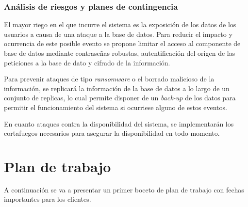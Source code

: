 \documentclass{article}
\begin{document}
\subsubsection*{Análisis de riesgos y planes de contingencia}

El mayor riego en el que incurre el sistema es la exposición de los datos de los usuarios a causa de una ataque a la base de datos. 
Para reducir el impacto y ocurrencia de este posible evento se propone limitar el acceso al componente de base de datos mediante contraseñas robustas, autentificación del origen de las peticiones a la base de dato y cifrado de la información.

Para prevenir ataques de tipo \textit{ransomware} o el borrado malicioso de la información, se replicará la información de la base de datos a lo largo de un conjunto de replicas, lo cual permite disponer de un \textit{back-up} de los datos para permitir el funcionamiento del sistema si ocurriese alguno de estos eventos.

En cuanto ataques contra la disponibilidad del sistema, se implementarán los cortafuegos necesarios para asegurar la disponibilidad en todo momento.


\pagebreak


\section{Plan de trabajo}
A continuación se va a presentar un primer boceto de plan de trabajo con fechas importantes para los clientes.
\end{document}
